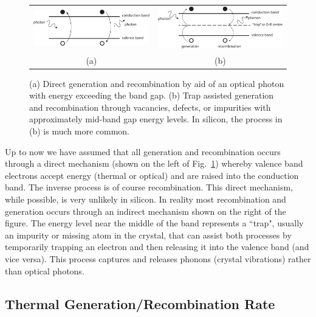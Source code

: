 \begin{figure}[tb]
\begin{center}
\begin{tabular}{cc}
\includegraphics[width=.5\columnwidth]{gr_direct} &
\includegraphics[width=.5\columnwidth]{gr_indirect} \\
(a) & (b) \\
\end{tabular}
\end{center}
\caption{(a) Direct generation and recombination by aid of an optical photon with energy exceeding the band gap.  (b)  Trap assisted generation and recombination through vacancies, defects, or impurities with approximately mid-band gap energy levels.  In silicon, the process in (b) is much more common. } \label{fig:gr_direct}
\end{figure}


Up to now we have assumed that all generation and recombination occurs through a direct mechanism (shown on the left of Fig.~\ref{fig:gr_direct}) whereby valence band electrons accept energy (thermal or optical) and are raised into the conduction band.  The inverse process is of course recombination. This direct mechanism, while possible, is very unlikely in silicon. In reality most recombination and generation occurs through an indirect mechanism shown on the right of the figure.  The energy level near the middle of the band represents a ``trap", usually an impurity or missing atom in the crystal, that can assist both processes by temporarily trapping an electron and then releasing it into the valence band (and vice versa). This process captures and releases phonons (crystal vibrations) rather than optical photons.

 

\subsection{Thermal Generation/Recombination Rate}

